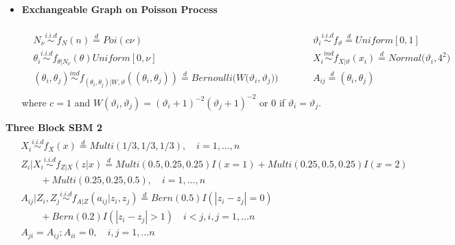 \documentclass[12pt]{article}
\theoremstyle{definition}
\begin{document}
\begin{itemize}
	\item \textbf{Exchangeable Graph on Poisson Process}
	
	\begin{eqnarray}
	\begin{gathered}
	\begin{split}
	N_{\nu} \overset{i.i.d}{\sim} f_{N}(n)   \stackrel{d}{=} Poi( c \nu)  &   \quad \quad &
	\vartheta_{i}  \overset{i.i.d}{\sim} f_{\vartheta} \stackrel{d}{=} Uniform[0,1] \\
	\theta_{i} \overset{i.i.d}{\sim} f_{\theta |  N_{\nu}} (\theta)     Uniform[0, \nu]  & \quad \quad  & X_{i}    \overset{ind}{\sim} f_{X | \vartheta}(x_{i}) \stackrel{d}{=} Normal \big( \vartheta_{i}, 4^2 \big)  \\ 
	(\theta_{i}, \theta_{j})  \overset{ind}{\sim} f_{ (\theta_{i}, \theta_{j})  | W, \vartheta} ( (\theta_{i}, \theta_{j}) ) \stackrel{d}{=}   Bernoulli \big( W\big( \vartheta_{i}, \vartheta_{j} \big) \big)  &  \quad \quad & A_{ij}  \stackrel{d}{=} (\theta_{i}, \theta_{j})
	\label{eq:sparse}
	\end{split}
	\end{gathered}	 
	\end{eqnarray}	
	where $c = 1$ and $W(\vartheta_{i}, \vartheta_{j} ) = (\vartheta_{i} + 1)^{-2} ( \vartheta_{j} + 1 )^{-2}$ or 0 if $\vartheta_{i} = \vartheta_{j}$. 
\end{itemize}

\textbf{Three Block SBM 2}
\begin{equation}
\begin{gathered}
\begin{aligned}
& X_{i} \overset{i.i.d}{\sim} f_{X}(x)   \stackrel{d}{=}  Multi(1/3, 1/3, 1/3), \quad i = 1, \ldots , n \\ & Z_{i} | X_{i}  \overset{i.i.d}{\sim}    f_{Z|X}(z|x)  \stackrel{d}{=}   Multi(0.5, 0.25, 0.25) I( x = 1 ) +   Multi(0.25, 0.5, 0.25) I (x = 2)   \\ &  \quad \quad + Multi(0.25, 0.25, 0.5), \quad  i = 1,\ldots,n  \\
& A_{ij} | Z_{i}, Z_{j}   \overset{i.i.d}{\sim}   f_{A|Z}(a_{ij} | z_{i}, z_{j})  \stackrel{d}{=} Bern(0.5) I ( |z_{i} - z_{j}| = 0 ) \\  &  \quad \quad + Bern(0.2) I(|z_{i} - z_{j}| > 1) \quad i < j, i,j=1, \ldots n \\ & A_{ji} = A_{ij} ;   A_{ii} = 0,   \quad  i,j=1, \ldots n
\end{aligned}
\end{gathered}
\label{eq:simplethree}
\end{equation}
\end{document}
